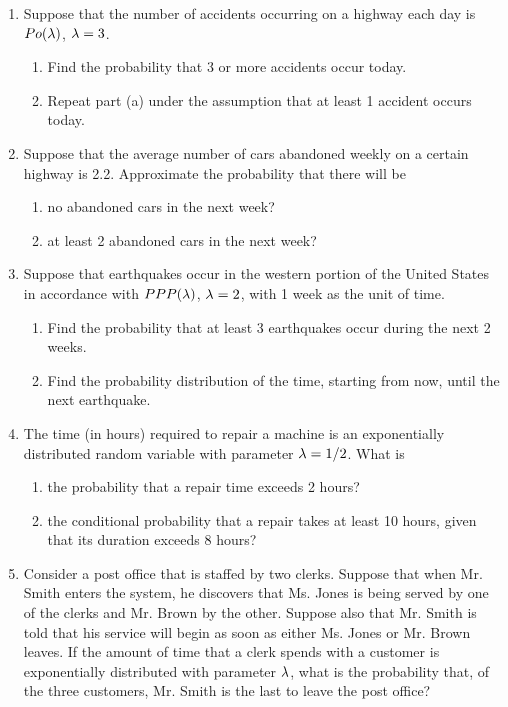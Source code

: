 \documentclass[12pt]{article}%
\newcommand{\0}{{\bf 0}}
\begin{document}
\begin{enumerate}
\item
Suppose that the number of accidents occurring on a highway each day is $Po(\lambda)$, $\lambda=3$.
\begin{enumerate}
\item  
Find the probability that 3 or more accidents occur today.
\item
Repeat part (a) under the assumption that at least 1 accident occurs today.
\end{enumerate}








\item
Suppose that the average number of cars abandoned weekly on a certain highway is 2.2. Approximate the probability that there will be
\begin{enumerate}
\item
no abandoned cars in the next week?
\item
at least 2 abandoned cars in the next week?
\end{enumerate}







\item
Suppose that earthquakes occur in the western portion of the United States in accordance with 
$PPP(\lambda)$, $\lambda=2$,  with 1 week as the unit of time.
\begin{enumerate}
\item  
Find the probability that at least 3 earthquakes occur during the next 2 weeks.
\item
Find the probability distribution of the time, starting from now, until the next earthquake.
\end{enumerate}







\item
The time (in hours) required to repair a machine is
an exponentially distributed random variable with parameter $\lambda= 1/2$. What is
\begin{enumerate}
\item the probability that a repair time exceeds 2
hours?
\item the conditional probability that a repair takes
at least 10 hours, given that its duration
exceeds 8 hours?
\end{enumerate}


\item
Consider a post office that is staffed by two clerks. Suppose that when Mr. Smith enters the system, he discovers that Ms. Jones is being served by one of the clerks and Mr. Brown by the other. Suppose also that Mr. Smith is told that his service will begin as soon as either Ms. Jones or Mr. Brown leaves. If the amount of time that a clerk spends with a customer is exponentially distributed with parameter $\lambda$, what is the probability that, of the three customers, Mr. Smith is the last to leave the post office?





\end{enumerate}
\end{document}
